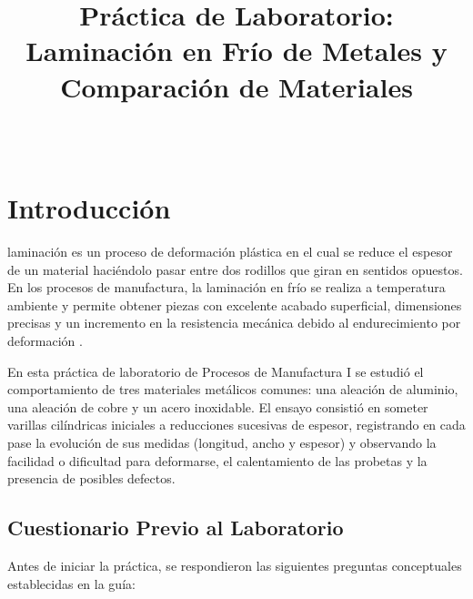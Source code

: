 \documentclass[journal]{IEEEtran}
\begin{document}
\title{Práctica de Laboratorio: Laminación en Frío de Metales y Comparación de Materiales}

\author{
     \\
}


\maketitle

\section{Introducción}
 laminación es un proceso de deformación plástica en el cual se reduce el espesor de un material haciéndolo pasar entre dos rodillos que giran en sentidos opuestos. En los procesos de manufactura, la laminación en frío se realiza a temperatura ambiente y permite obtener piezas con excelente acabado superficial, dimensiones precisas y un incremento en la resistencia mecánica debido al endurecimiento por deformación \cite{kalpakjian2014, groover2020}.

En esta práctica de laboratorio de Procesos de Manufactura I se estudió el comportamiento de tres materiales metálicos comunes: una aleación de aluminio, una aleación de cobre y un acero inoxidable. El ensayo consistió en someter varillas cilíndricas iniciales a reducciones sucesivas de espesor, registrando en cada pase la evolución de sus medidas (longitud, ancho y espesor) y observando la facilidad o dificultad para deformarse, el calentamiento de las probetas y la presencia de posibles defectos.

\subsection{Cuestionario Previo al Laboratorio}
Antes de iniciar la práctica, se respondieron las siguientes preguntas conceptuales establecidas en la guía:
\end{document}
